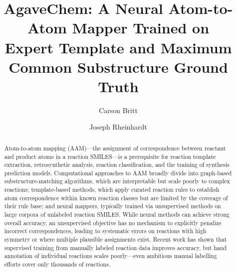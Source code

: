 \documentclass[12pt]{article}
\title{\textbf{AgaveChem: A Neural Atom-to-Atom Mapper Trained on\\
Expert Template and Maximum Common Substructure Ground Truth}}
\author[1]{Carson Britt}
\author[1]{Joseph Rheinhardt}
\affil[1]{De Novo Chem\\
\small carson.britt@denovochem.com, joseph.rheinhardt@denovochem.com}
\begin{document}
\maketitle

\begin{abstract}
  Atom-to-atom mapping (AAM)---the assignment of correspondence between
  reactant and product atoms in a reaction SMILES---is a prerequisite for
  reaction template extraction, retrosynthetic analysis, reaction
  classification, and the training of synthesis prediction models.
  Computational approaches to AAM broadly divide into graph-based
  substructure-matching algorithms, which are interpretable but scale
  poorly to complex reactions; template-based methods, which apply curated reaction
  rules to establish atom correspondence within known reaction classes but
  are limited by the coverage of their rule base; and neural mappers,
  typically trained via unsupervised methods on large corpora of unlabeled
  reaction SMILES.
  While neural methods can achieve strong overall accuracy, an unsupervised
  objective has no mechanism to explicitly penalize incorrect
  correspondences, leading to systematic errors on reactions with high
  symmetry or where multiple plausible assignments exist.  Recent work has
  shown that supervised training from manually labeled reaction data
  improves accuracy, but hand annotation of individual reactions scales
  poorly---even ambitious manual labelling efforts cover only thousands
  of reactions.


\end{abstract}
\end{document}
